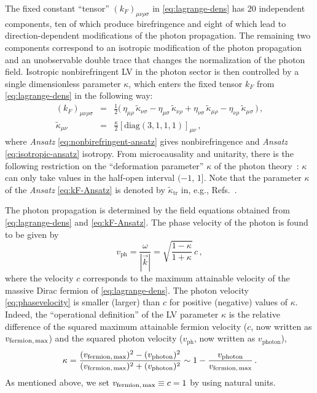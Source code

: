 \documentclass[aps,prd,preprint,longbibliography]{revtex4-1}
\begin{document}
The fixed constant ``tensor'' $(k_F)_{\mu\nu\rho\sigma}$
in \eqref{eq:lagrange-dens}  has 20
independent components, ten of which produce birefringence and eight
of which lead to direction-dependent modifications of the photon
propagation. The remaining two components correspond to an isotropic
modification of the photon propagation and an unobservable double
trace that changes the normalization of the photon field. Isotropic
nonbirefringent LV in the photon sector is then controlled by a single
dimensionless parameter $\kappa$, which enters the fixed tensor $k_F$
from \eqref{eq:lagrange-dens} in the following way:
\begin{subequations}\label{eq:kF-Ansatz}
\begin{eqnarray}
\label{eq:nonbirefringent-ansatz}
(k_F)_{\mu\nu\rho\sigma} &=&
\frac{1}{2} \big(\,
\eta_{\mu\rho}\,\widetilde{\kappa}_{\nu\sigma} -
\eta_{\mu\sigma}\,\widetilde{\kappa}_{\nu\rho} +
\eta_{\nu\sigma}\,\widetilde{\kappa}_{\mu\rho} -
\eta_{\nu\rho}\,\widetilde{\kappa}_{\mu\sigma}  \,\big) \,,
\\[2mm]
\label{eq:isotropic-ansatz}
\widetilde{\kappa}_{\mu\nu}
&=& \frac{\kappa}{2}\left[\text{diag}(3,1,1,1)\right]_{\mu\nu}\,,
\end{eqnarray}
\end{subequations}
where \textit{Ansatz} \eqref{eq:nonbirefringent-ansatz}
gives nonbirefringence
and \textit{Ansatz} \eqref{eq:isotropic-ansatz} isotropy.
From microcausality and unitarity, there is the following
restriction on the ``deformation parameter'' $\kappa$ of the photon
theory~\cite{KlinkhamerSchreck2011}:
$\kappa$ can only take values in the half-open interval $(-1,\,1]$.
Note that the parameter $\kappa$ of the
\textit{Ansatz} \eqref{eq:kF-Ansatz} is denoted by
$\widetilde{\kappa}_\text{tr}$ in, e.g.,
Refs.~\cite{KlinkhamerSchreck2008,KosteleckyRussell2011,KosteleckyMewes2002,%
KlinkhamerSchreck2011}.


The photon propagation is determined by the field equations
obtained from \eqref{eq:lagrange-dens} and \eqref{eq:kF-Ansatz}.
The phase velocity of the photon is found to be given by
\begin{equation}
v_\text{ph} = \frac{\omega}{|\vec{k}|} =
\sqrt{\frac{1-\kappa}{1+\kappa}}\, c\,,
\label{eq:phasevelocity}
\end{equation}
where the velocity $c$ corresponds to the maximum attainable velocity
of the massive Dirac fermion of \eqref{eq:lagrange-dens}.
The photon velocity \eqref{eq:phasevelocity}
is smaller (larger) than $c$ for positive (negative) values of
$\kappa$.
Indeed, the ``operational definition'' of the
LV parameter $\kappa$ is the relative difference of
the squared maximum attainable fermion velocity
($c$, now written as $v_\text{fermion,\,max}$)
and the squared photon velocity ($v_\text{ph}$, now written as $v_\text{photon}$),
\begin{equation}
\kappa
 = \frac{(v_\text{fermion,\,max})^2 - (v_\text{photon})^2}
        {(v_\text{fermion,\,max})^2 + (v_\text{photon})^2}
 \sim 1 -  \frac{v_\text{photon}}{v_\text{fermion,\,max}}
 \,.
\label{eq:kappa-operational-definition}
\end{equation}
As mentioned above,
we set $v_\text{fermion,\,max}\equiv c=1$ by using natural units.
\end{document}
